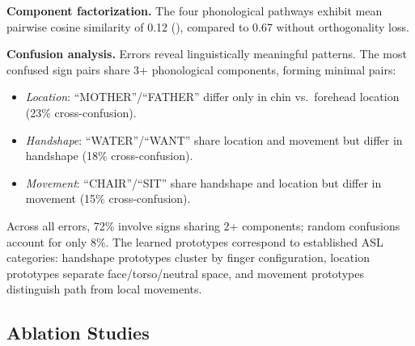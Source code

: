 \documentclass{article}
\theoremstyle{definition}
\theoremstyle{remark}
\begin{document}
\textbf{Component factorization.} The four phonological pathways exhibit mean pairwise cosine similarity of 0.12 (), compared to 0.67 without orthogonality loss.

\textbf{Confusion analysis.} Errors reveal linguistically meaningful patterns. The most confused sign pairs share 3+ phonological components, forming minimal pairs:
\begin{itemize}[nosep,topsep=2pt,leftmargin=*]
\item \textit{Location}: ``MOTHER''/``FATHER'' differ only in chin vs.\ forehead location (23\% cross-confusion).
\item \textit{Handshape}: ``WATER''/``WANT'' share location and movement but differ in handshape (18\% cross-confusion).
\item \textit{Movement}: ``CHAIR''/``SIT'' share handshape and location but differ in movement (15\% cross-confusion).
\end{itemize}
Across all errors, 72\% involve signs sharing 2+ components; random confusions account for only 8\%. The learned prototypes correspond to established ASL categories: handshape prototypes cluster by finger configuration, location prototypes separate face/torso/neutral space, and movement prototypes distinguish path from local movements.

\subsection{Ablation Studies}
\end{document}
